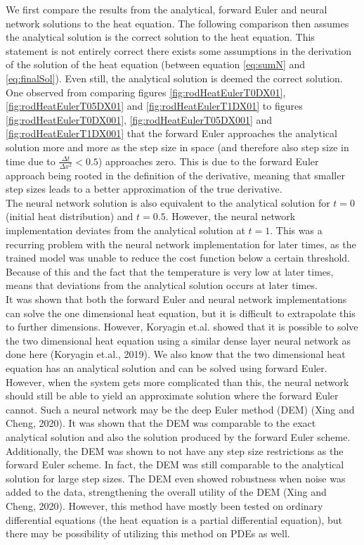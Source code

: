 \documentclass[12pt,a4paper]{article}
\begin{document}
\noindent We first compare the results from the analytical, forward Euler and neural network solutions to the heat equation. The following comparison then assumes the analytical solution is the correct solution to the heat equation. This statement is not entirely correct there exists some assumptions in the derivation of the solution of the heat equation (between equation \ref{eq:sumN} and \ref{eq:finalSol}). Even still, the analytical solution is deemed the correct solution. 
\\
One observed from comparing figures \ref{fig:rodHeatEulerT0DX01}, \ref{fig:rodHeatEulerT05DX01} and \ref{fig:rodHeatEulerT1DX01} to figures \ref{fig:rodHeatEulerT0DX001}, \ref{fig:rodHeatEulerT05DX001} and \ref{fig:rodHeatEulerT1DX001} that the forward Euler approaches the analytical solution more and more as the step size in space (and therefore also step size in time due to $\frac{\Delta t}{\Delta x^2} < 0.5$) approaches zero. This is due to the forward Euler approach being rooted in the definition of the derivative, meaning that smaller step sizes leads to a better approximation of the true derivative.
\\
The neural network solution is also equivalent to the analytical solution for $t = 0$ (initial heat distribution) and $t = 0.5$. However, the neural network implementation deviates from the analytical solution at $t = 1$. This was a recurring problem with the neural network implementation for later times, as the trained model was unable to reduce the cost function below a certain threshold. Because of this and the fact that the temperature is very low at later times, means that deviations from the analytical solution occurs at later times.
\\
It was shown that both the forward Euler and neural network implementations can solve the one dimensional heat equation, but it is difficult to extrapolate this to further dimensions. However, Koryagin et.al. showed that it is possible to solve the two dimensional heat equation using a similar dense layer neural network as done here (Koryagin et.al., 2019). We also know that the two dimensional heat equation has an analytical solution and can be solved using forward Euler. However, when the system gets more complicated than this, the neural network should still be able to yield an approximate solution where the forward Euler cannot. Such a neural network may be the deep Euler method (DEM) (Xing and Cheng, 2020). It was shown that the DEM was comparable to the exact analytical solution and also the solution produced by the forward Euler scheme. Additionally, the DEM was shown to not have any step size restrictions as the forward Euler scheme. In fact, the DEM was still comparable to the analytical solution for large step sizes. The DEM even showed robustness when noise was added to the data, strengthening the overall utility of the DEM (Xing and Cheng, 2020). However, this method have mostly been tested on ordinary differential equations (the heat equation is a partial differential equation), but there may be possibility of utilizing this method on PDEs as well. 
\end{document}
